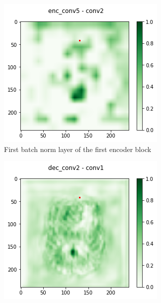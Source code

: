 \begin{figure}[H]
    \begin{subfigure}{.33\textwidth}
        \centering
        \includegraphics[width=\linewidth]{chapters/04_segmentation/images/grad_cam_17.png}
        \caption{First batch norm layer of the first encoder block}
    \end{subfigure}%
    \begin{subfigure}{.33\textwidth}
        \centering
        \includegraphics[width=\linewidth]{chapters/04_segmentation/images/grad_cam_24.png}

\end{subfigure}
\end{figure}
